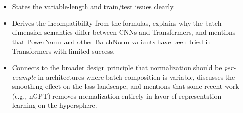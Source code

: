 \begin{interviewq}

\goodgreat
\begin{itemize}
    \item {} States the variable-length and train/test issues clearly.
    \item {} Derives the incompatibility from the formulas, explains why the batch dimension semantics differ between CNNs and Transformers, and mentions that PowerNorm and other BatchNorm variants have been tried in Transformers with limited success.
    \item {} Connects to the broader design principle that normalization should be \textit{per-example} in architectures where batch composition is variable, discusses the smoothing effect on the loss landscape, and mentions that some recent work (e.g., nGPT) removes normalization entirely in favor of representation learning on the hypersphere.
\end{itemize}

\end{interviewq}


